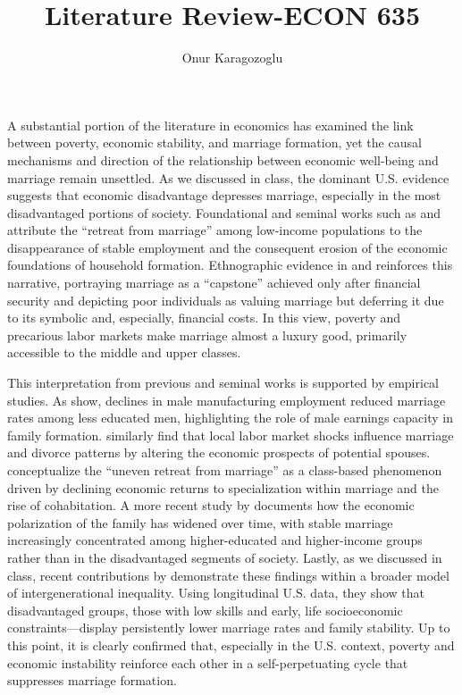 

\title{Literature Review-ECON 635}
\author{Onur Karagozoglu}
\date{}
\doublespacing



\maketitle


A substantial portion of the literature in economics has examined the link between poverty, economic stability, and marriage formation, yet the causal mechanisms and direction of the relationship between economic well-being and marriage remain unsettled. As we discussed in class, the dominant U.S. evidence suggests that economic disadvantage depresses marriage, especially in the most disadvantaged portions of society. Foundational and seminal works such as \citet{Wilson1987} and \citet{Murray1994} attribute the ``retreat from marriage'' among low-income populations to the disappearance of stable employment and the consequent erosion of the economic foundations of household formation. Ethnographic evidence in \citet{EdinKefalas2005} and \citet{Cherlin2004} reinforces this narrative, portraying marriage as a ``capstone'' achieved only after financial security and depicting poor individuals as valuing marriage but deferring it due to its symbolic and, especially, financial costs. In this view, poverty and precarious labor markets make marriage almost a luxury good, primarily accessible to the middle and upper classes. 

This interpretation from previous and seminal works is supported by empirical studies. As \citet{Autor2019} show, declines in male manufacturing employment reduced marriage rates among less educated men, highlighting the role of male earnings capacity in family formation. \citet{GouldPaserman2003} similarly find that local labor market shocks influence marriage and divorce patterns by altering the economic prospects of potential spouses. \citet{LundbergPollak2007} conceptualize the ``uneven retreat from marriage'' as a class-based phenomenon driven by declining economic returns to specialization within marriage and the rise of cohabitation. A more recent study by \citet{BlauKahnWaldfogel2013} documents how the economic polarization of the family has widened over time, with stable marriage increasingly concentrated among higher-educated and higher-income groups rather than in the disadvantaged segments of society. Lastly, as we discussed in class, recent contributions by \citet{GarciaHeckman2023} demonstrate these findings within a broader model of intergenerational inequality. Using longitudinal U.S. data, they show that disadvantaged groups, those with low skills and early, life socioeconomic constraints—display persistently lower marriage rates and family stability. Up to this point, it is clearly confirmed that, especially in the U.S. context, poverty and economic instability reinforce each other in a self-perpetuating cycle that suppresses marriage formation.

